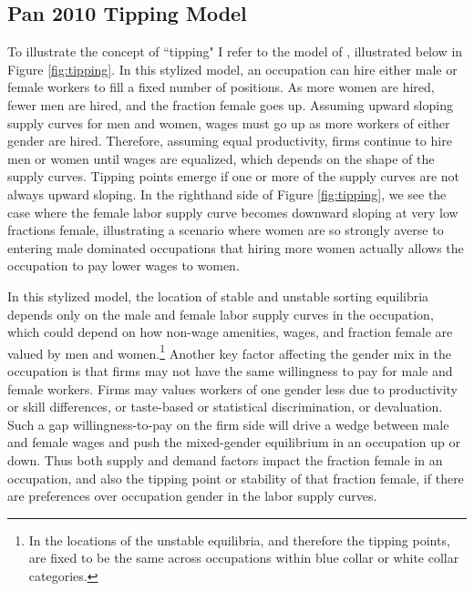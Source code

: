 \documentclass[11pt]{article}
\begin{document}
\subsection{Pan 2010 Tipping Model}\label{sec.Pan}
To illustrate the concept of ``tipping" I refer to the model of , illustrated below in Figure \ref{fig:tipping}. In this stylized model, an occupation can hire either male or female workers to fill a fixed number of positions. As more women are hired, fewer men are hired, and the fraction female goes up. Assuming upward sloping supply curves for men and women, wages must go up as more workers of either gender are hired. Therefore, assuming equal productivity, firms continue to hire men or women until wages are equalized, which depends on the shape of the supply curves. Tipping points emerge if one or more of the supply curves are not always upward sloping. In the righthand side of Figure \ref{fig:tipping}, we see the case where the female labor supply curve becomes downward sloping at very low fractions female, illustrating a scenario where women are so strongly averse to entering male dominated occupations that hiring more women actually allows the occupation to pay lower wages to women.


In this stylized model, the location of stable and unstable sorting equilibria depends only on the male and female labor supply curves in the occupation, which could depend on how non-wage amenities, wages, and fraction female are valued by men and women.\footnote{In  the locations of the unstable equilibria, and therefore the tipping points, are fixed to be the same across occupations within blue collar or white collar categories.} Another key factor affecting the gender mix in the occupation is that firms may not have the same willingness to pay for male and female workers. Firms may values workers of one gender less due to productivity or skill differences, or taste-based or statistical discrimination, or devaluation. Such a gap willingness-to-pay on the firm side will drive a wedge between male and female wages and push the mixed-gender equilibrium in an occupation up or down. Thus both supply and demand factors impact the fraction female in an occupation, and also the tipping point or stability of that fraction female, if there are preferences over occupation gender in the labor supply curves.
\end{document}
